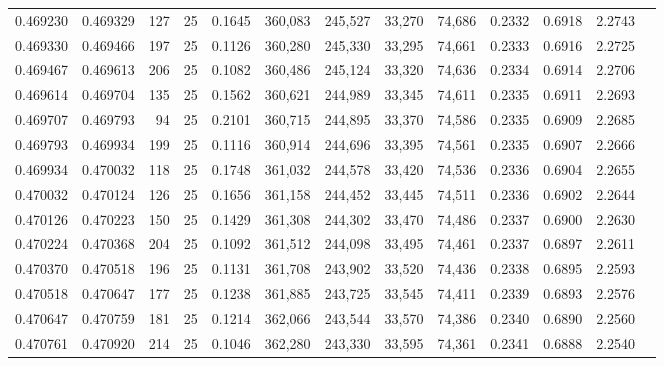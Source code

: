 \begin{tabular}{rrrrrrrrrrrrr}
0.469230 & 0.469329 &   127 &  25 &                                     0.1645 & 360,083 & 245,527 &  33,270 &  74,686 & 0.2332 & 0.6918 & 2.2743 \\
0.469330 & 0.469466 &   197 &  25 &                                     0.1126 & 360,280 & 245,330 &  33,295 &  74,661 & 0.2333 & 0.6916 & 2.2725 \\
0.469467 & 0.469613 &   206 &  25 &                                     0.1082 & 360,486 & 245,124 &  33,320 &  74,636 & 0.2334 & 0.6914 & 2.2706 \\
0.469614 & 0.469704 &   135 &  25 &                                     0.1562 & 360,621 & 244,989 &  33,345 &  74,611 & 0.2335 & 0.6911 & 2.2693 \\
0.469707 & 0.469793 &    94 &  25 &                                     0.2101 & 360,715 & 244,895 &  33,370 &  74,586 & 0.2335 & 0.6909 & 2.2685 \\
0.469793 & 0.469934 &   199 &  25 &                                     0.1116 & 360,914 & 244,696 &  33,395 &  74,561 & 0.2335 & 0.6907 & 2.2666 \\
0.469934 & 0.470032 &   118 &  25 &                                     0.1748 & 361,032 & 244,578 &  33,420 &  74,536 & 0.2336 & 0.6904 & 2.2655 \\
0.470032 & 0.470124 &   126 &  25 &                                     0.1656 & 361,158 & 244,452 &  33,445 &  74,511 & 0.2336 & 0.6902 & 2.2644 \\
0.470126 & 0.470223 &   150 &  25 &                                     0.1429 & 361,308 & 244,302 &  33,470 &  74,486 & 0.2337 & 0.6900 & 2.2630 \\
0.470224 & 0.470368 &   204 &  25 &                                     0.1092 & 361,512 & 244,098 &  33,495 &  74,461 & 0.2337 & 0.6897 & 2.2611 \\
0.470370 & 0.470518 &   196 &  25 &                                     0.1131 & 361,708 & 243,902 &  33,520 &  74,436 & 0.2338 & 0.6895 & 2.2593 \\
0.470518 & 0.470647 &   177 &  25 &                                     0.1238 & 361,885 & 243,725 &  33,545 &  74,411 & 0.2339 & 0.6893 & 2.2576 \\
0.470647 & 0.470759 &   181 &  25 &                                     0.1214 & 362,066 & 243,544 &  33,570 &  74,386 & 0.2340 & 0.6890 & 2.2560 \\
0.470761 & 0.470920 &   214 &  25 &                                     0.1046 & 362,280 & 243,330 &  33,595 &  74,361 & 0.2341 & 0.6888 & 2.2540 \\

\end{tabular}

